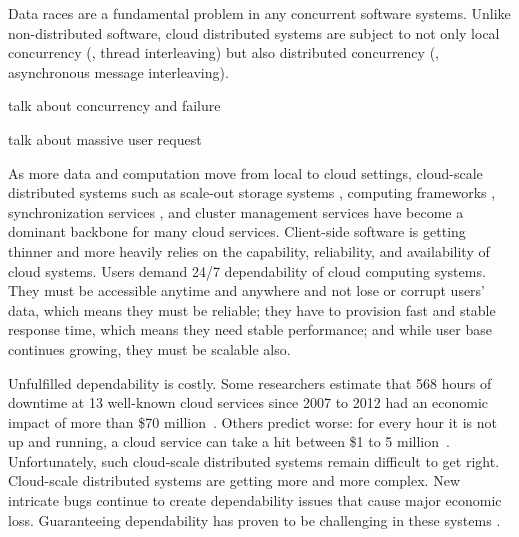 Data races are a fundamental problem in any concurrent software systems. Unlike
non-distributed software, cloud distributed systems are subject to not only
local concurrency (\eg, thread interleaving) but also distributed concurrency
(\eg, asynchronous message interleaving).

talk about concurrency and failure

talk about massive user request


As more data and computation move from local to cloud settings, cloud-scale
distributed systems such as scale-out storage systems \cite{Chang+06-BigTable,
DeCandia+07-Dynamo, Ghemawat+03-GoogleFS, Nightingale+12-FlatFDS}, computing
frameworks \cite{DeanGhemawat04-MapReduce, Murray+13-NaiadTimelyDataflow},
synchronization services \cite{Burrows06-Chubby, Hunt+10-ZooKeeperPaper}, and
cluster management services \cite{Hindman+11-Mesos, Kumar+13-Yarn} have become a
dominant backbone for many cloud services. Client-side software is getting
thinner and more heavily relies on the capability, reliability, and availability
of cloud systems. Users demand 24/7 dependability of cloud computing systems.
They must be accessible anytime and anywhere and not lose or corrupt users'
data, which means they must be reliable; they have to provision fast and stable
response time, which means they need stable performance; and while user base
continues growing, they must be scalable also.

Unfulfilled dependability is costly. Some researchers estimate that 568 hours of
downtime at 13 well-known cloud services since 2007 to 2012 had an economic
impact of more than \$70 million~\cite{Essers12-70Million}. Others predict
worse: for every hour it is not up and running, a cloud service can take a hit
between \$1 to 5 million~\cite{Linthicum13-InfoworldCostOutages}.
Unfortunately, such cloud-scale distributed systems remain difficult to get
right. 
%
Cloud-scale distributed systems are getting more and more complex. New intricate
bugs continue to create dependability issues that cause major economic loss.
Guaranteeing dependability has proven to be challenging in these systems
\cite{Gunawi+11-FateDestini, Guo+11-Demeter, Wang+14-Exalt, Yang+09-Modist}.


